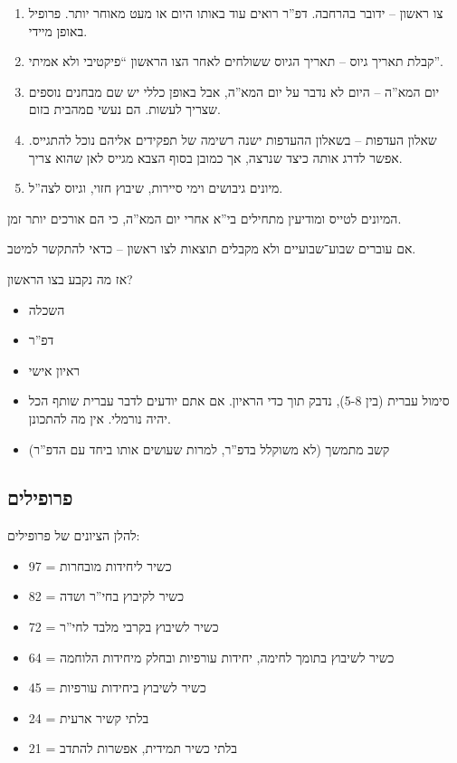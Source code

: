 \documentclass[]{article}
\begin{document}
	\begin{enumerate}
		\item צו ראשון – ידובר בהרחבה. דפ''ר רואים עוד באותו היום או מעט מאוחר יותר. פרופיל באופן מיידי. 
		\item קבלת תאריך גיוס – תאריך הגיוס ששולחים לאחר הצו הראשון ``פיקטיבי ולא אמיתי''. 
		\item 	יום המא''ה – היום לא נדבר על יום המא''ה, אבל באופן כללי יש שם מבחנים נוספים שצריך לעשות. הם נעשי םמהבית בזום. 
		\item 	שאלון העדפות – בשאלון ההעדפות ישנה רשימה של תפקידים אליהם נוכל להתגייס. אפשר לדרג אותה כיצד שנרצה, אך כמובן בסוף הצבא מגייס לאן שהוא צריך. 
		\item מיונים גיבושים וימי סיירות, שיבוץ חזוי, וגיוס לצה''ל. 
	\end{enumerate}
	המיונים לטייס ומודיעין מתחילים בי''א אחרי יום המא''ה, כי הם אורכים יותר זמן. 
	
	אם עוברים שבוע־שבועיים ולא מקבלים תוצאות לצו ראשון – כדאי להתקשר למיטב. 
	
	אז מה נקבע בצו הראשון? 
	\begin{itemize}
		\item השכלה
		\item דפ''ר
		\item ראיון אישי
		\item סימול עברית (בין 5-8), נדבק תוך כדי הראיון. אם אתם יודעים לדבר עברית שותף הכל יהיה נורמלי. אין מה להתכונן. 
		\item קשב מתמשך (לא משוקלל בדפ''ר, למרות שעושים אותו ביחד עם הדפ''ר)
	\end{itemize}
	
	\subsection*{פרופילים}
	להלן הציונים של פרופילים: 
	\begin{itemize}
		\item 97 = כשיר ליחידות מובחרות
		\item 82 = כשיר לקיבוץ בחי''ר ושדה
		\item 72 = כשיר לשיבוץ בקרבי מלבד לחי''ר
		\item 64 = כשיר לשיבוץ בתומך לחימה, יחידות עורפיות ובחלק מיחידות הלוחמה
		\item 45 = כשיר לשיבוץ ביחידות עורפיות
		\item 24 = בלתי קשיר ארעית
		\item 21 = בלתי כשיר תמידית, אפשרות להתדב
	\end{itemize}
	
\end{document}

